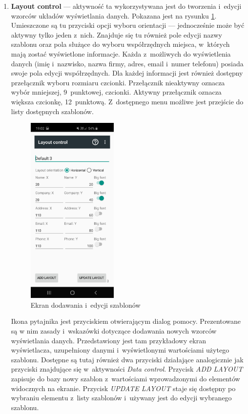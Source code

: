 \documentclass[a4paper,12pt, twoside]{article}
\begin{document}
\begin{enumerate}
    	   \item \textbf{Layout control} — aktywność ta wykorzystywana jest do tworzenia i~edycji wzorców układów wyświetlania danych. Pokazana jest na rysunku \ref{fig:layoutControl}. Umieszczone są tu przyciski opcji wyboru orientacji — jednocześnie może być aktywny tylko jeden z~nich. Znajduje się tu również pole edycji nazwy szablonu oraz pola służące do wyboru współrzędnych miejsca, w~których mają zostać wyświetlone informacje. Każda z~możliwych do wyświetlenia danych (imię i~nazwisko, nazwa firmy, adres, email i~numer telefonu) posiada swoje pola edycji współrzędnych. Dla każdej informacji jest również dostępny przełącznik wyboru rozmiaru czcionki. Przełącznik nieaktywny oznacza wybór mniejszej, 9~punktowej, czcionki. Aktywny przełącznik oznacza większa czcionkę, 12~punktową. Z~dostępnego menu możliwe jest przejście do listy dostępnych szablonów. 
    	   \begin{figure}[H]
    	        \centering
    	        \includegraphics[width=4.5cm]{images/view_layoutEdit.jpg}
    			\caption{ Ekran dodawania i~edycji szablonów}
                \label{fig:layoutControl}
    	   \end{figure}
    	   Ikona pytajnika jest przyciskiem otwierającym dialog pomocy. Prezentowane są w nim zasady i~wskazówki dotyczące dodawania nowych wzorców wyświetlania danych. Przedstawiony jest tam przykładowy ekran wyświetlacza, uzupełniony danymi i~wyświetlonymi wartościami użytego szablonu.
    	   Dostępne są tutaj również dwa przyciski działające analogicznie jak przyciski znajdujące się w~aktywności \textit{Data control}. Przycisk \textit{ADD LAYOUT} zapisuje do bazy nowy szablon z~wartościami wprowadzonymi do elementów widocznych na ekranie. Przycisk \textit{UPDATE LAYOUT} staje się dostępny po wybraniu elementu z~listy szablonów i~używany jest do edycji wybranego szablonu.
    	   

\end{enumerate}
\end{document}
